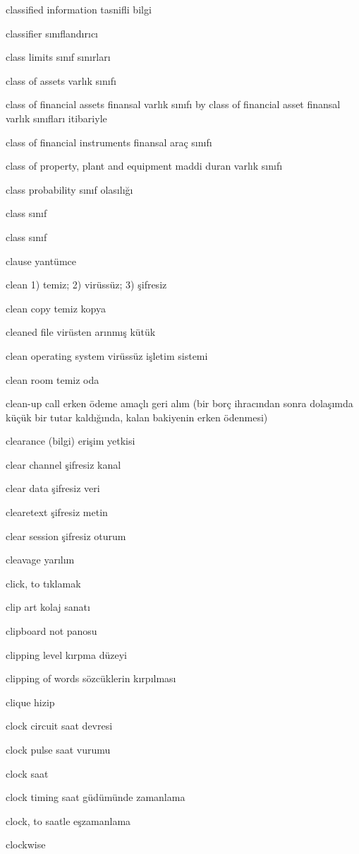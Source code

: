 \documentclass[12pt,fleqn]{article}\usepackage{../../common}
\begin{document}
classified information tasnifli bilgi

classifier sınıflandırıcı

class limits sınıf sınırları

class of assets varlık sınıfı

class of financial assets finansal varlık sınıfı by class of financial asset finansal varlık sınıfları itibariyle

class of financial instruments finansal araç sınıfı

class of property, plant and equipment maddi duran varlık sınıfı

class probability sınıf olasılığı

class sınıf

class sınıf

clause yantümce

clean 1) temiz; 2) virüssüz; 3) şifresiz

clean copy temiz kopya

cleaned file virüsten arınmış kütük

clean operating system virüssüz işletim sistemi

clean room temiz oda

clean-up call erken ödeme amaçlı geri alım (bir borç ihracından sonra dolaşımda küçük bir tutar kaldığında, kalan bakiyenin erken ödenmesi)

clearance (bilgi) erişim yetkisi

clear channel şifresiz kanal

clear data şifresiz veri

clearetext şifresiz metin

clear session şifresiz oturum

cleavage yarılım

click, to tıklamak

clip art kolaj sanatı

clipboard not panosu

clipping level kırpma düzeyi

clipping of words sözcüklerin kırpılması

clique hizip

clock circuit saat devresi

clock pulse saat vurumu

clock saat

clock timing saat güdümünde zamanlama

clock, to saatle eşzamanlama

clockwise
\end{document}
